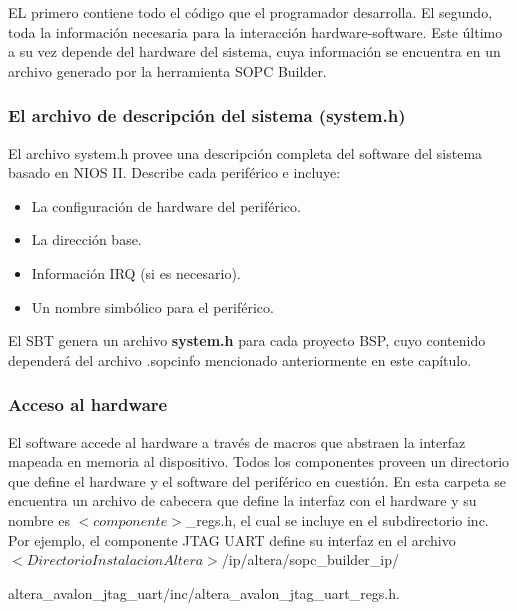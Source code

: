EL primero contiene todo el código que el programador desarrolla. El segundo, toda la información necesaria para la interacción hardware-software. Este último a su vez depende del hardware del sistema, cuya información se encuentra en un archivo generado por la herramienta SOPC Builder.

\subsubsection*{El archivo de descripción del sistema (system.h)}
El archivo system.h provee una descripción completa del software del sistema basado en NIOS II. Describe cada periférico e incluye:

\begin{itemize}
	\item La configuración de hardware del periférico.
	\item La dirección base.
	\item Información IRQ (si es necesario).
	\item Un nombre simbólico para el periférico.
\end{itemize}

El SBT genera un archivo \textbf{system.h} para cada proyecto BSP, cuyo contenido dependerá del archivo .sopcinfo mencionado anteriormente en este capítulo.

\subsubsection*{Acceso al hardware}
El software accede al hardware a través de macros que abstraen la interfaz mapeada en memoria al dispositivo. Todos los componentes proveen un directorio que define el hardware y el software del periférico en cuestión. En esta carpeta se encuentra un archivo de cabecera que define la interfaz con el hardware y su nombre es $<componente>$\_regs.h, el cual se incluye en el subdirectorio inc. Por ejemplo, el componente JTAG UART define su interfaz en el archivo $<Directorio Instalacion Altera>$/ip/altera/sopc\_builder\_ip/

altera\_avalon\_jtag\_uart/inc/altera\_avalon\_jtag\_uart\_regs.h.

